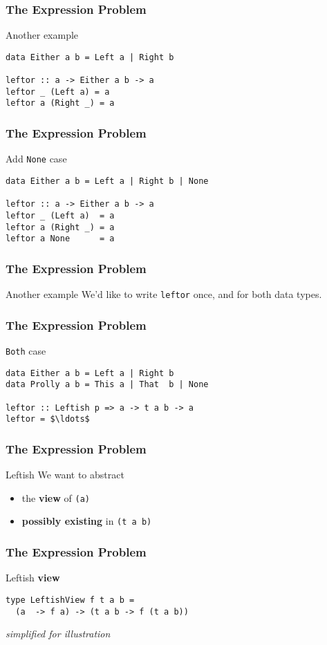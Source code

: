 \begin{frame}[fragile]
\frametitle{The Expression Problem}
\begin{block}{Another example}
\begin{lstlisting}[style=haskell,mathescape]
data Either a b = Left a | Right b

leftor :: a -> Either a b -> a
leftor _ (Left a) = a
leftor a (Right _) = a
\end{lstlisting}
\end{block}
\end{frame}

\begin{frame}[fragile]
\frametitle{The Expression Problem}
\begin{block}{Add \lstinline[style=haskell]{None} case}
\begin{lstlisting}[style=haskell,mathescape]
data Either a b = Left a | Right b | None

leftor :: a -> Either a b -> a
leftor _ (Left a)  = a
leftor a (Right _) = a
leftor a None      = a
\end{lstlisting}
\end{block}
\end{frame}

\begin{frame}[fragile]
\frametitle{The Expression Problem}
\begin{block}{Another example}
We'd like to write \lstinline[style=haskell]{leftor} once, and for both data types.
\end{block}
\end{frame}

\begin{frame}[fragile]
\frametitle{The Expression Problem}
\begin{block}{\lstinline[style=haskell]{Both} case}
\begin{lstlisting}[style=haskell,mathescape]
data Either a b = Left a | Right b
data Prolly a b = This a | That  b | None 

leftor :: Leftish p => a -> t a b -> a
leftor = $\ldots$
\end{lstlisting}
\end{block}
\end{frame}

\begin{frame}[fragile]
\frametitle{The Expression Problem}
\begin{block}{Leftish}
We want to abstract
\begin{itemize}
\item the \textbf{view} of \lstinline{(a)}
\item \textbf{possibly existing} in \lstinline{(t a b)}
\end{itemize}
\end{block}
\end{frame}

\begin{frame}[fragile]
\frametitle{The Expression Problem}
\begin{block}{Leftish \textbf{view}}
\begin{lstlisting}[style=haskell,mathescape]
type LeftishView f t a b =
  (a  -> f a) -> (t a b -> f (t a b))
\end{lstlisting}
\end{block}
\tiny{\emph{simplified for illustration}}
\end{frame}
